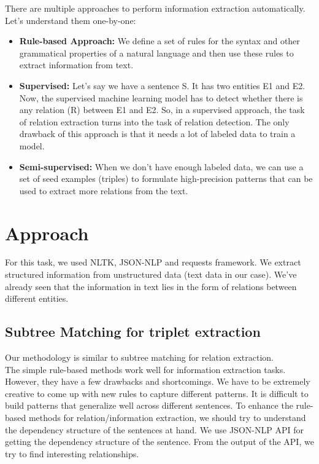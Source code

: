 \documentclass[11pt,letterpaper]{article}
\begin{document}
There are multiple approaches to perform information extraction automatically. Let’s understand them one-by-one:
\begin{itemize}
    \item \textbf{Rule-based Approach:} We define a set of rules for the syntax and other grammatical properties of a natural language and then use these rules to extract information from text. 
    \item \textbf{Supervised:} Let’s say we have a sentence S. It has two entities E1 and E2. Now, the supervised machine learning model has to detect whether there is any relation (R) between E1 and E2. So, in a supervised approach, the task of relation extraction turns into the task of relation detection. The only drawback of this approach is that it needs a lot of labeled data to train a model.
    \item \textbf{Semi-supervised:} When we don’t have enough labeled data, we can use a set of seed examples (triples) to formulate high-precision patterns that can be used to extract more relations from the text.

\end{itemize}

\section{Approach}
For this task, we used NLTK, JSON-NLP and requests framework. We extract structured information from unstructured data (text data in our case). We’ve already seen that the information in text lies in the form of relations between different entities. \subsection{Subtree Matching for triplet extraction}
Our methodology is similar to subtree matching for relation extraction.\\

The simple rule-based methods work well for information extraction tasks. However, they have a few drawbacks and shortcomings. We have to be extremely creative to come up with new rules to capture different patterns. It is difficult to build patterns that generalize well across different sentences. To enhance the rule-based methods for relation/information extraction, we should try to understand the dependency structure of the sentences at hand. We use JSON-NLP API for getting the dependency structure of the sentence. From the output of the API, we try to find interesting relationships. \\
\end{document}
